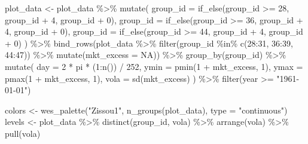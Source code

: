 \documentclass[
]{book}
\newenvironment{Shaded}{\begin{snugshade}}{\end{snugshade}}
\newcommand{\AttributeTok}[1]{\textcolor[rgb]{0.61,0.61,0.61}{#1}}
\newcommand{\ConstantTok}[1]{\textcolor[rgb]{0,0,0}{#1}}
\newcommand{\DecValTok}[1]{\textcolor[rgb]{0.06,0.06,0.06}{#1}}
\newcommand{\FunctionTok}[1]{\textcolor[rgb]{0,0,0}{#1}}
\newcommand{\NormalTok}[1]{#1}
\newcommand{\OtherTok}[1]{\textcolor[rgb]{0.37,0.37,0.37}{#1}}
\newcommand{\SpecialCharTok}[1]{\textcolor[rgb]{0,0,0}{#1}}
\newcommand{\StringTok}[1]{\textcolor[rgb]{0.5,0.5,0.5}{#1}}
\begin{document}
\begin{Shaded}
\begin{Highlighting}[]
\NormalTok{plot\_data }\OtherTok{\textless{}{-}}\NormalTok{ plot\_data }\SpecialCharTok{\%\textgreater{}\%}
  \FunctionTok{mutate}\NormalTok{(}
    \AttributeTok{group\_id =} \FunctionTok{if\_else}\NormalTok{(group\_id }\SpecialCharTok{\textgreater{}=} \DecValTok{28}\NormalTok{, group\_id }\SpecialCharTok{+} \DecValTok{4}\NormalTok{, group\_id }\SpecialCharTok{+} \DecValTok{0}\NormalTok{),}
    \AttributeTok{group\_id =} \FunctionTok{if\_else}\NormalTok{(group\_id }\SpecialCharTok{\textgreater{}=} \DecValTok{36}\NormalTok{, group\_id }\SpecialCharTok{+} \DecValTok{4}\NormalTok{, group\_id }\SpecialCharTok{+} \DecValTok{0}\NormalTok{),}
    \AttributeTok{group\_id =} \FunctionTok{if\_else}\NormalTok{(group\_id }\SpecialCharTok{\textgreater{}=} \DecValTok{44}\NormalTok{, group\_id }\SpecialCharTok{+} \DecValTok{4}\NormalTok{, group\_id }\SpecialCharTok{+} \DecValTok{0}\NormalTok{)}
\NormalTok{  ) }\SpecialCharTok{\%\textgreater{}\%}
  \FunctionTok{bind\_rows}\NormalTok{(plot\_data }\SpecialCharTok{\%\textgreater{}\%}
    \FunctionTok{filter}\NormalTok{(group\_id }\SpecialCharTok{\%in\%} \FunctionTok{c}\NormalTok{(}\DecValTok{28}\SpecialCharTok{:}\DecValTok{31}\NormalTok{, }\DecValTok{36}\SpecialCharTok{:}\DecValTok{39}\NormalTok{, }\DecValTok{44}\SpecialCharTok{:}\DecValTok{47}\NormalTok{)) }\SpecialCharTok{\%\textgreater{}\%}
    \FunctionTok{mutate}\NormalTok{(}\AttributeTok{mkt\_excess =} \ConstantTok{NA}\NormalTok{)) }\SpecialCharTok{\%\textgreater{}\%}
  \FunctionTok{group\_by}\NormalTok{(group\_id) }\SpecialCharTok{\%\textgreater{}\%}
  \FunctionTok{mutate}\NormalTok{(}
    \AttributeTok{day =} \DecValTok{2} \SpecialCharTok{*}\NormalTok{ pi }\SpecialCharTok{*}\NormalTok{ (}\DecValTok{1}\SpecialCharTok{:}\FunctionTok{n}\NormalTok{()) }\SpecialCharTok{/} \DecValTok{252}\NormalTok{,}
    \AttributeTok{ymin =} \FunctionTok{pmin}\NormalTok{(}\DecValTok{1} \SpecialCharTok{+}\NormalTok{ mkt\_excess, }\DecValTok{1}\NormalTok{),}
    \AttributeTok{ymax =} \FunctionTok{pmax}\NormalTok{(}\DecValTok{1} \SpecialCharTok{+}\NormalTok{ mkt\_excess, }\DecValTok{1}\NormalTok{),}
    \AttributeTok{vola =} \FunctionTok{sd}\NormalTok{(mkt\_excess)}
\NormalTok{  ) }\SpecialCharTok{\%\textgreater{}\%}
  \FunctionTok{filter}\NormalTok{(year }\SpecialCharTok{\textgreater{}=} \StringTok{"1961{-}01{-}01"}\NormalTok{)}

\NormalTok{colors }\OtherTok{\textless{}{-}} \FunctionTok{wes\_palette}\NormalTok{(}\StringTok{"Zissou1"}\NormalTok{, }\FunctionTok{n\_groups}\NormalTok{(plot\_data), }\AttributeTok{type =} \StringTok{"continuous"}\NormalTok{)}
\NormalTok{levels }\OtherTok{\textless{}{-}}\NormalTok{ plot\_data }\SpecialCharTok{\%\textgreater{}\%}
  \FunctionTok{distinct}\NormalTok{(group\_id, vola) }\SpecialCharTok{\%\textgreater{}\%}
  \FunctionTok{arrange}\NormalTok{(vola) }\SpecialCharTok{\%\textgreater{}\%}
  \FunctionTok{pull}\NormalTok{(vola)}


\end{Highlighting}
\end{Shaded}
\end{document}
